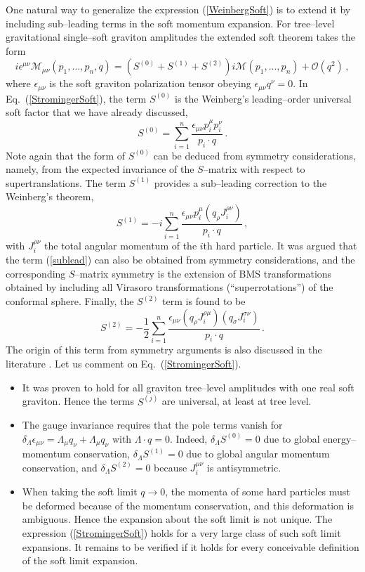 \documentclass[12pt]{article}
\newcommand{\be}{\begin{equation}}
\newcommand{\ee}{\end{equation}}
\newcommand{\M}{\mathcal{M}}
\begin{document}
One natural way to generalize the expression (\ref{WeinbergSoft}) is to extend it by including sub--leading terms in the soft momentum expansion. For tree--level gravitational single--soft graviton amplitudes the extended soft theorem takes the form \cite{Cachazo:2014fwa}
\be\label{StromingerSoft}
i\epsilon^{\mu\nu}\M_{\mu\nu}(p_1,...,p_n,q)=(S^{(0)}+S^{(1)}+S^{(2)})i\M(p_1,...,p_n)+\mathcal{O}(q^2)\,,
\ee
where $\epsilon_{\mu\nu}$ is the soft graviton polarization tensor obeying $\epsilon_{\mu\nu}q^\nu=0$. In Eq.~(\ref{StromingerSoft}), the term $S^{(0)}$ is the Weinberg's leading--order universal soft factor that we have already discussed,
\be\label{lead}
S^{(0)}=\sum_{i=1}^n\dfrac{\epsilon_{\mu\nu}p^\mu_ip^\nu_i}{p_i\cdot q}\,.
\ee
Note again that the form of $S^{(0)}$ can be deduced from symmetry considerations, namely, from the expected invariance of the $S$--matrix with respect to supertranslations. The term $S^{(1)}$ provides a sub--leading correction to the Weinberg's theorem,
\be\label{sublead}
S^{(1)}=-i\sum_{i=1}^n\dfrac{\epsilon_{\mu\nu}p_i^\mu(q_\rho J^{\rho\nu}_i)}{p_i\cdot q}\,,
\ee
with $J^{\rho\nu}_i$ the total angular momentum of the $i$th hard particle. It was argued that the term (\ref{sublead}) can also be obtained from symmetry considerations, and the corresponding $S$--matrix symmetry is the extension of BMS transformations obtained by including all Virasoro transformations (``superrotations'') of the conformal sphere. Finally, the $S^{(2)}$ term is found to be
\be
S^{(2)}=-\dfrac{1}{2}\sum_{i=1}^n\dfrac{\epsilon_{\mu\nu}(q_\rho J^{\rho\mu}_i)(q_\sigma J^{\sigma\nu}_i)}{p_i\cdot q}\,.
\ee
The origin of this term from symmetry arguments is also discussed in the literature \cite{Campiglia:2016efb}. Let us comment on Eq.~(\ref{StromingerSoft}).
\begin{itemize}
\item It was proven to hold for all graviton tree--level amplitudes with one real soft graviton. Hence the terms $S^{(j)}$ are universal, at least at tree level.
\item The gauge invariance requires that the pole terms vanish for $\delta_\Lambda \epsilon_{\mu\nu}=\Lambda_\mu q_\nu+\Lambda_\mu q_\nu$ with $\Lambda\cdot q=0$. Indeed, $\delta_\Lambda S^{(0)}=0$ due to global energy--momentum conservation, $\delta_\Lambda S^{(1)}=0$ due to global angular momentum conservation, and $\delta_\Lambda S^{(2)}=0$ because $J^{\mu\nu}_i$ is antisymmetric.
\item When taking the soft limit $q\rightarrow 0$, the momenta of some hard particles must be deformed because of the momentum conservation, and this deformation is ambiguous. Hence the expansion about the soft limit is not unique. The expression (\ref{StromingerSoft}) holds for a very large class of such soft limit expansions. It remains to be verified if it holds for every conceivable definition of the soft limit expansion.
\end{itemize}
\end{document}
